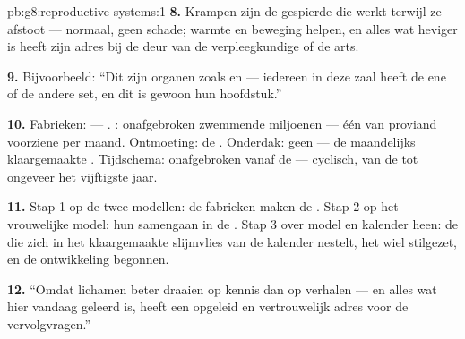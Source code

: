 \begin{solution}{pb:g8:reproductive-systems:1}
\textbf{8.} Krampen zijn de gespierde  die werkt terwijl ze
afstoot --- normaal, geen schade; warmte en beweging helpen, en alles wat
heviger is heeft zijn adres bij de deur van de verpleegkundige of de arts.

\textbf{9.} Bijvoorbeeld: ``Dit zijn organen zoals  en  ---
iedereen in deze zaal heeft de ene of de andere set, en dit is gewoon hun
hoofdstuk.''

\textbf{10.} Fabrieken:  --- . : onafgebroken
zwemmende miljoenen --- één van proviand voorziene  per maand.
Ontmoeting: de . Onderdak: geen --- de maandelijks klaargemaakte
. Tijdschema: onafgebroken vanaf de  --- cyclisch, van
de  tot ongeveer het vijftigste jaar.

\textbf{11.} Stap 1 op de twee modellen: de fabrieken maken de .
Stap 2 op het vrouwelijke model: hun samengaan in de . Stap 3 over
model en kalender heen: de  die zich in het klaargemaakte slijmvlies
van de kalender nestelt, het wiel stilgezet, en de ontwikkeling begonnen.

\textbf{12.} ``Omdat lichamen beter draaien op kennis dan op verhalen ---
en alles wat hier vandaag geleerd is, heeft een opgeleid en vertrouwelijk
adres voor de vervolgvragen.''
\end{solution}

